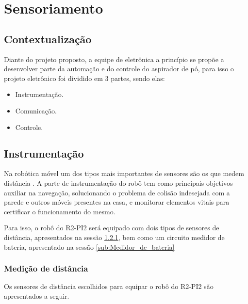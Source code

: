 \section{Sensoriamento} %
\label{sec:sensoriamento}
\subsection{Contextualização}

Diante do projeto proposto, a equipe de eletrônica a princípio se propõe a desenvolver parte da automação e do controle do aspirador de pó, para isso o projeto eletrônico foi dividido em 3 partes, sendo elas:
  \begin{itemize}
    \item Instrumentação.
    \item Comunicação.
    \item Controle.
  \end{itemize}

\subsection{Instrumentação} %
\label{sub:instrumentação}


	Na robótica móvel um dos tipos mais importantes de sensores são os que medem distância \cite{braunl}. A parte de instrumentação do robô tem como principais objetivos auxiliar na navegação, solucionando o problema de colisão indesejada com a parede e outros móveis presentes na casa, e monitorar elementos vitais para certificar o funcionamento do mesmo.

	Para isso, o robô do R2-PI2 será equipado com dois tipos de sensores de distância, apresentados na sessão \ref{sub:Medição_de_distância}, bem como um circuito medidor de bateria, apresentado na sessão \ref{sub:Medidor_de_bateria}

\subsubsection{Medição de distância}
\label{sub:Medição_de_distância}
	Os sensores de distância escolhidos para equipar o robô do R2-PI2 são apresentados a seguir.
  
